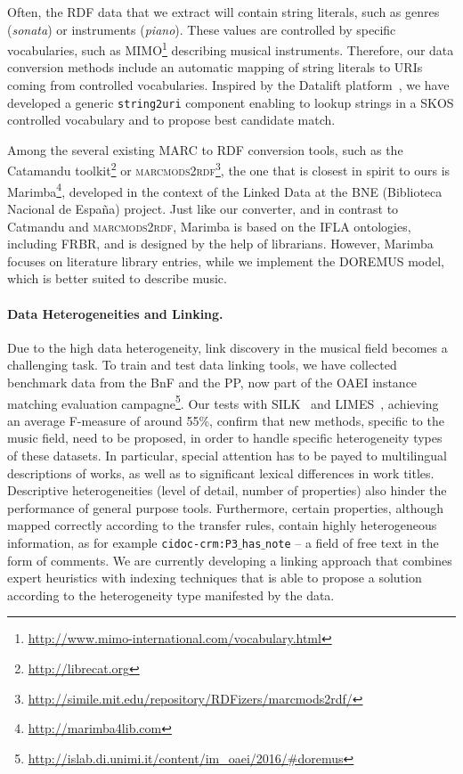 \documentclass[runningheads,a4paper]{llncs}
\begin{document}
\vspace{-0.5cm}
Often, the RDF data that we extract will contain string literals, such as genres ({\it sonata}) or instruments ({\it piano}). These values are controlled by specific vocabularies, such as MIMO\footnote{\url{http://www.mimo-international.com/vocabulary.html}} describing musical instruments. Therefore, our data conversion methods include an automatic mapping of string literals to URIs coming from controlled vocabularies. Inspired by the Datalift platform~\cite{datalift}, we have developed a generic \texttt{string2uri} component enabling to lookup strings in a SKOS controlled vocabulary and to propose best candidate match.

Among the several existing MARC to RDF conversion tools, such as the Catamandu toolkit\footnote{\url{http://librecat.org}} or \textsc{marcmods2rdf}\footnote{\url{http://simile.mit.edu/repository/RDFizers/marcmods2rdf/}}, the one that is closest in spirit to ours is Marimba\footnote{\url{http://marimba4lib.com}}, developed in the context of the Linked Data at the BNE (Biblioteca Nacional de Espa\~na) project. Just like our converter, and in contrast to Catmandu and \textsc{marcmods2rdf}, Marimba is based on the IFLA ontologies, including FRBR, and is designed by the help of librarians. However, Marimba focuses on literature library entries, while we implement the DOREMUS model, which is better suited to describe music.

\paragraph{{\bf Data Heterogeneities and Linking.}} Due to the high data heterogeneity, link discovery in the musical field becomes a challenging task. To train and test data linking tools, we have collected benchmark data from the BnF and the PP, now part of the OAEI instance matching evaluation campagne\footnote{\url{http://islab.di.unimi.it/content/im_oaei/2016/\#doremus}}. Our tests with SILK~\cite{jentzsch2010silk} and LIMES~\cite{ngomo2011limes}, achieving an average F-measure of around 55\%, confirm that new methods, specific to the music field, need to be proposed, in order to handle specific heterogeneity types of these datasets. In particular, special attention has to be payed to multilingual descriptions of works, as well as to significant lexical differences in work titles. Descriptive heterogeneities (level of detail, number of properties) also hinder the performance of general purpose tools. Furthermore, certain properties, although mapped correctly according to the transfer rules, contain highly heterogeneous information, as for example \texttt{cidoc-crm:P3$\_$has$\_$note} -- a field of free text in the form of comments. We are currently developing a linking approach that combines expert heuristics with indexing techniques that is able to propose a solution according to the heterogeneity type manifested by the data.
\end{document}
